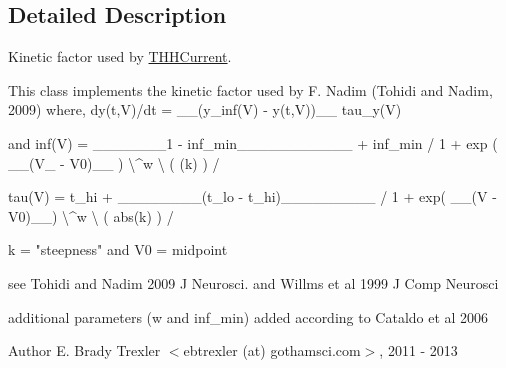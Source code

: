\subsection{Detailed Description}
Kinetic factor used by \hyperlink{class_t_h_h_current}{T\+H\+H\+Current}. 


\begin{DoxyPre}
 This class implements the kinetic factor used by F. Nadim (Tohidi and Nadim, 2009)
 where,               dy(t,V)/dt = \_\_(y\_inf(V) - y(t,V))\_\_
                                           tau\_y(V)\end{DoxyPre}



\begin{DoxyPre} and
         inf(V) =   \_\_\_\_\_\_\_1 - inf\_min\_\_\_\_\_\_\_\_\_\_\_  + inf\_min
                     / 1 + exp ( \_\_(V\_ - V0)\_\_ ) \textbackslash{}^w
                     \textbackslash{}         (       (k)     ) /\end{DoxyPre}



\begin{DoxyPre}         tau(V) = t\_hi + \_\_\_\_\_\_\_\_(t\_lo - t\_hi)\_\_\_\_\_\_\_\_\_
                          / 1 + exp( \_\_(V - V0)\_\_) \textbackslash{}^w
                          \textbackslash{}        (   abs(k)    ) /\end{DoxyPre}



\begin{DoxyPre}      k = "steepness" and V0 = midpoint\end{DoxyPre}



\begin{DoxyPre}      see Tohidi and Nadim 2009 J Neurosci. and Willms et al 1999 J Comp Neurosci\end{DoxyPre}



\begin{DoxyPre}      additional parameters (w and inf\_min) added according to Cataldo et al 2006
\end{DoxyPre}


\begin{DoxyAuthor}{Author}
E. Brady Trexler $<$ebtrexler (at) gothamsci.\+com$>$, 2011 -\/ 2013 
\end{DoxyAuthor}


